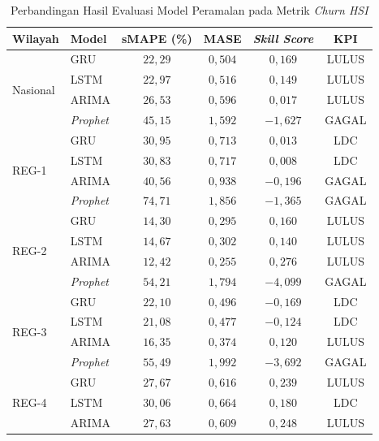 \begin{table}[htbp]
\centering
\caption{Perbandingan Hasil Evaluasi Model Peramalan pada Metrik \textit{Churn HSI}}
\label{tab:hasil-forecasting-churn}
\begin{tabular}{|p{2.2cm}|p{1.5cm}|c|c|c|c|}
\hline
\textbf{Wilayah} & \textbf{Model} & \textbf{sMAPE (\%)} & \textbf{MASE} & \textbf{\textit{Skill Score}} & \textbf{KPI} \\
\hline
\multirow{4}{*}{Nasional} & GRU & $22{,}29$ & $0{,}504$ & $0{,}169$ & LULUS \\
\cline{2-6}
 & LSTM & $22{,}97$ & $0{,}516$ & $0{,}149$ & LULUS \\
\cline{2-6}
 & ARIMA & $26{,}53$ & $0{,}596$ & $0{,}017$ & LULUS \\
\cline{2-6}
 & \textit{Prophet} & $45{,}15$ & $1{,}592$ & $-1{,}627$ & GAGAL \\
\hline
\multirow{4}{*}{REG-1} & GRU & $30{,}95$ & $0{,}713$ & $0{,}013$ & LDC \\
\cline{2-6}
 & LSTM & $30{,}83$ & $0{,}717$ & $0{,}008$ & LDC \\
\cline{2-6}
 & ARIMA & $40{,}56$ & $0{,}938$ & $-0{,}196$ & GAGAL \\
\cline{2-6}
 & \textit{Prophet} & $74{,}71$ & $1{,}856$ & $-1{,}365$ & GAGAL \\
\hline
\multirow{4}{*}{REG-2} & GRU & $14{,}30$ & $0{,}295$ & $0{,}160$ & LULUS \\
\cline{2-6}
 & LSTM & $14{,}67$ & $0{,}302$ & $0{,}140$ & LULUS \\
\cline{2-6}
 & ARIMA & $12{,}42$ & $0{,}255$ & $0{,}276$ & LULUS \\
\cline{2-6}
 & \textit{Prophet} & $54{,}21$ & $1{,}794$ & $-4{,}099$ & GAGAL \\
\hline
\multirow{4}{*}{REG-3} & GRU & $22{,}10$ & $0{,}496$ & $-0{,}169$ & LDC \\
\cline{2-6}
 & LSTM & $21{,}08$ & $0{,}477$ & $-0{,}124$ & LDC \\
\cline{2-6}
 & ARIMA & $16{,}35$ & $0{,}374$ & $0{,}120$ & LULUS \\
\cline{2-6}
 & \textit{Prophet} & $55{,}49$ & $1{,}992$ & $-3{,}692$ & GAGAL \\
\hline
\multirow{4}{*}{REG-4} & GRU & $27{,}67$ & $0{,}616$ & $0{,}239$ & LULUS \\
\cline{2-6}
 & LSTM & $30{,}06$ & $0{,}664$ & $0{,}180$ & LDC \\
\cline{2-6}
 & ARIMA & $27{,}63$ & $0{,}609$ & $0{,}248$ & LULUS \\

\end{tabular}
\end{table}
